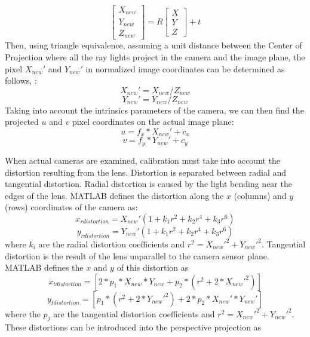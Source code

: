 %
\begin{equation}
\left[\begin{array}{c} X_{new} \\ Y_{new} \\ Z_{new} \end{array} \right]
=
R
\left[\begin{array}{c} X \\ Y \\ Z \end{array} \right]
+ t
\end{equation}
%
Then, using triangle equivalence, assuming a unit distance between the Center of Projection where all the ray lights project in the camera and the image plane, the pixel $X_{new}'$ and $Y_{new}'$ in normalized image coordinates can be determined as follows, :
%
\begin{equation}
X_{new}'=X_{new}/Z_{new}
\end{equation}
\begin{equation}
Y_{new}'=Y_{new}/Z_{new}
\end{equation}
Taking into account the intrinsics parameters of the camera, we can then find the projected $u$ and $v$ pixel coordinates on the actual image plane: 
\begin{equation}
u=f_{x}*X_{new}'+c_{x} 
\end{equation}
\begin{equation}
v=f_{y}*Y_{new}'+c_{y}
\end{equation}

When actual cameras are examined, calibration must take into account the distortion resulting from the lens. Distortion is separated between radial and tangential distortion. Radial distortion is caused by the light bending near the edges of the lens. MATLAB defines the distortion along the $x$ (columns) and $y$ (rows) coordinates of the camera as: 
%
\begin{equation}
x_{r\textit{distortion}} = X_{new}'(1+k_{1}r^{2}+k_{2}r^{4}+k_{3}r^{6})
\end{equation}
\begin{equation}
y_{r\textit{distortion}} = Y_{new}'(1+k_{1}r^{2}+k_{2}r^{4}+k_{3}r^{6})
\end{equation}
%
where $k_{i}$ are the radial distortion coefficients and $r^{2} = X_{new}'^{2}+Y_{new}'^{2}$. Tangential distortion is the result of the lens unparallel to the camera sensor plane. MATLAB defines the $x$ and $y$ of this distortion as 
%
\begin{equation}
x_{t\textit{distortion}} = [2*p_{1}*X_{new}*Y_{new}+p_{2}*(r^{2}+2*X_{new}'^{2})]
\end{equation}
\begin{equation}
y_{t\textit{distortion}} = [p_{1}*(r^{2}+2*Y_{new}'^{2})+2*p_{2}*X_{new}'*Y_{new}']
\end{equation}
% 
where the $p_j$ are the tangential distortion coefficients and $r^{2} = X_{new}'^{2}+Y_{new}'^{2}$. 
%
These distortions can be introduced into the perspective projection as

